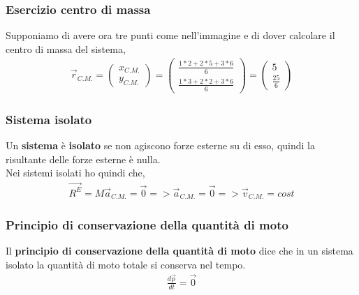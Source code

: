         \subsubsection{Esercizio centro di massa}
        Supponiamo di avere ora tre punti come nell'immagine e di dover calcolare il centro di massa del sistema,
        \begin{align*}
            \vec{r}_{C.M.}=
            \left(\begin{array}{c}x_{C.M.} \\y_{C.M.}\end{array} \right)=
            \left(\begin{array}{c}\frac{1*2+2*5+3*6}{6} \\\frac{1*3+2*2+3*6}{6}\end{array} \right)= \left(\begin{array}{c}5 \\\frac{25}{6}\end{array} \right)
        \end{align*}

        \subsubsection{Sistema isolato}
            Un \textbf{sistema} è \textbf{isolato} se non agiscono forze esterne su di esso, quindi la risultante delle forze esterne è nulla.\\
            Nei sistemi isolati ho quindi che,
            \begin{align*}
                \vec{R^E}=M\vec{a}_{C.M.}=\vec{0} => \vec{a}_{C.M.}=\vec{0} =>\vec{v}_{C.M.}=cost
            \end{align*}

        \subsubsection{Principio di conservazione della quantità di moto}
            Il \textbf{principio di conservazione della quantità di moto} dice che in un sistema isolato la quantità di moto totale si conserva nel tempo.
            \begin{align*}
                \frac{d\vec{p}}{dt}=\vec{0}
            \end{align*}

